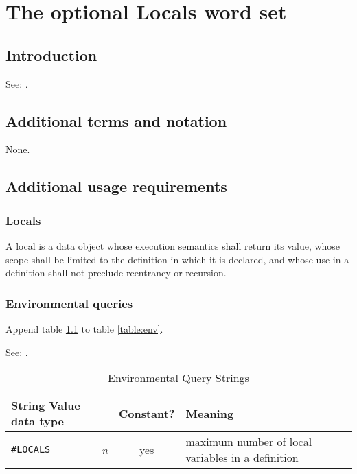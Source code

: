 \chapter{The optional Locals word set} %

\section{Introduction} %

See: .

\section{Additional terms and notation} %

None.

\section{Additional usage requirements} %

\subsection{Locals} %

A local is a data object whose execution semantics shall return its
value, whose scope shall be limited to the definition in which it is
declared, and whose use in a definition shall not preclude reentrancy
or recursion.

\subsection{Environmental queries} %

Append table \ref{local:env} to table \ref{table:env}.

See: .

\begin{table}[h]
  \begin{center}
	\caption{Environmental Query Strings}
	\label{local:env}
	\begin{tabular}{p{9em}rcp{}}
		\hline\hline
		\multicolumn{2}{l}{String \hfill Value data type} & Constant? & Meaning \\
		\hline
		\texttt{\#LOCALS}		& \emph{n}	& yes
			& maximum number of local variables in a definition \\
		\hline\hline
	\end{tabular}
  \end{center}
\end{table}

